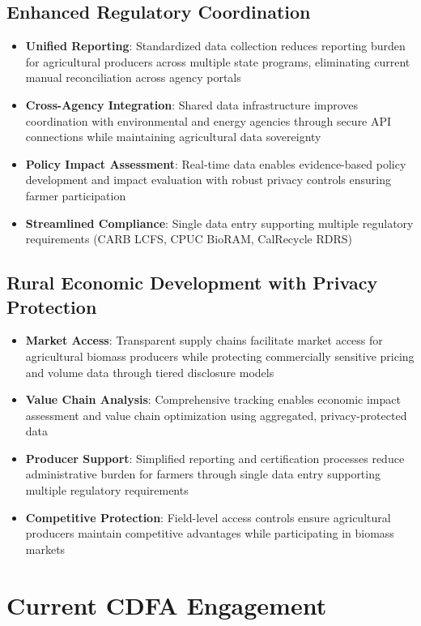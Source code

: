 \documentclass[title=small,preset=opensansnote,par=skip]{article}
\begin{document}
\subsection{Enhanced Regulatory Coordination}
\label{sec:org0a70ef9}
\begin{itemize}
\item \textbf{Unified Reporting}: Standardized data collection reduces reporting burden for agricultural producers across multiple state programs, eliminating current manual reconciliation across agency portals
\item \textbf{Cross-Agency Integration}: Shared data infrastructure improves coordination with environmental and energy agencies through secure API connections while maintaining agricultural data sovereignty
\item \textbf{Policy Impact Assessment}: Real-time data enables evidence-based policy development and impact evaluation with robust privacy controls ensuring farmer participation
\item \textbf{Streamlined Compliance}: Single data entry supporting multiple regulatory requirements (CARB LCFS, CPUC BioRAM, CalRecycle RDRS)
\end{itemize}
\subsection{Rural Economic Development with Privacy Protection}
\label{sec:org5bc0d0e}
\begin{itemize}
\item \textbf{Market Access}: Transparent supply chains facilitate market access for agricultural biomass producers while protecting commercially sensitive pricing and volume data through tiered disclosure models
\item \textbf{Value Chain Analysis}: Comprehensive tracking enables economic impact assessment and value chain optimization using aggregated, privacy-protected data
\item \textbf{Producer Support}: Simplified reporting and certification processes reduce administrative burden for farmers through single data entry supporting multiple regulatory requirements
\item \textbf{Competitive Protection}: Field-level access controls ensure agricultural producers maintain competitive advantages while participating in biomass markets
\end{itemize}
\section{Current CDFA Engagement}
\label{sec:org0719d28}
\end{document}
